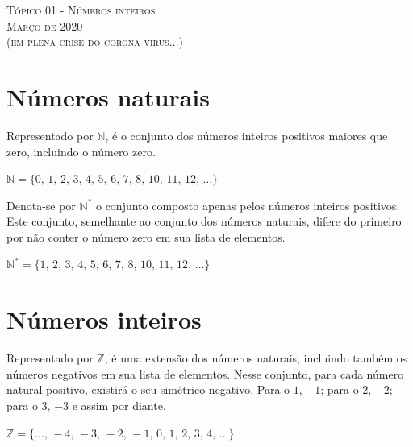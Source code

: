 \documentclass{exam}
\begin{document}
	\begin{center}
\large{\textsc{Tópico 01 - Números inteiros\\
Março de 2020\\ (em plena crise do corona vírus$\ldots$)}}
	\end{center}

	
	\begin{multicols*}{2}
	\setlength{\columnseprule}{1pt}


\tableofcontents

\section{Números naturais}

Representado por $\mathbb{N}$, é o conjunto dos números inteiros positivos maiores que zero, incluindo o número zero.

\begin{center}
	$\mathbb{N} = \{0,\, 1,\, 2,\, 3,\, 4,\, 5,\, 6,\, 7,\, 8,\, 10,\, 11,\, 12,\, \ldots\}$
\end{center}

Denota-se por $\mathbb{N^*}$ o conjunto composto apenas pelos números inteiros positivos. Este conjunto, semelhante ao conjunto dos números naturais, difere do primeiro por não conter o número zero em sua lista de elementos.

\begin{center}
	$\mathbb{N^*} = \{1,\, 2,\, 3,\, 4,\, 5,\, 6,\, 7,\, 8,\, 10,\, 11,\, 12,\, \ldots\}$	
\end{center}



\section{Números inteiros}

Representado por $\mathbb{Z}$, é uma extensão dos números naturais, incluindo também os números negativos em sua lista de elementos. Nesse conjunto, para cada número natural positivo, existirá o seu simétrico negativo. Para o $1$, $-1$; para o $2$, $-2$; para o $3$, $-3$ e assim por diante.

\begin{center}
	$\mathbb{Z} = \{\ldots,\, -4,\, -3,\, -2,\, -1,\, 0,\, 1,\, 2,\, 3,\, 4,\, \ldots\}$	
\end{center}


\end{multicols*}
\end{document}
